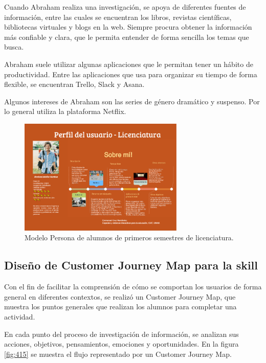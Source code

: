 Cuando Abraham realiza una investigación, se apoya de diferentes fuentes de información, entre las cuales se encuentran los libros, revistas científicas, bibliotecas virtuales y blogs en la web. Siempre procura obtener la información más confiable y clara, que le permita entender de forma sencilla los temas que busca.

Abraham suele utilizar algunas aplicaciones que le permitan tener un hábito de productividad. Entre las aplicaciones que usa para organizar su tiempo de forma flexible, se encuentran Trello, Slack y Asana.

Algunos intereses de Abraham son las series de género dramático y suspenso. Por lo general utiliza la plataforma Netflix.

\begin{figure}
  \centering
  \includegraphics[width=0.70\textwidth]{Cap4/Figuras/Lic.png}
  \caption{Modelo Persona de alumnos de primeros semestres de licenciatura.}
  \label{fig:414}
\end{figure}


\subsection{Diseño de Customer Journey Map para la skill}
\label{DisenioCustomerJourneyMapSkillcapIV}

Con el fin de facilitar la comprensión de cómo se comportan los usuarios de forma general en diferentes contextos, se realizó un Customer Journey Map, que muestra los puntos generales que realizan los alumnos para completar una actividad.

En cada punto del proceso de investigación de información, se analizan sus acciones, objetivos, pensamientos, emociones y oportunidades. En la figura \ref{fig:415} se muestra el flujo representado por un Customer Journey Map.

